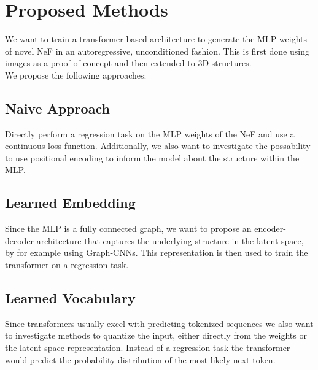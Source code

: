 \section{Proposed Methods}
\label{sec:method}
We want to train a transformer-based architecture to generate the MLP-weights of novel
NeF in an autoregressive, unconditioned fashion. This is first done using images as a
proof of concept and then extended to 3D structures.\\

\noindent We propose the following approaches:
\subsection*{Naive Approach}
Directly perform a regression task on the MLP weights of the NeF and use a continuous loss function.
Additionally, we also want to investigate the possability to use positional encoding to inform the model about the structure within the MLP.
\subsection*{Learned Embedding}
Since the MLP is a fully connected graph, we want to propose an encoder-decoder architecture that captures the underlying structure in the latent space, by for example using Graph-CNNs. This representation is then used to train the transformer on a regression task.
\subsection*{Learned Vocabulary}
Since transformers usually excel with predicting tokenized sequences we also want to investigate methods to quantize the input, either directly from the weights or the latent-space representation. Instead of a regression task the transformer would predict the probability distribution of the most likely next token.
